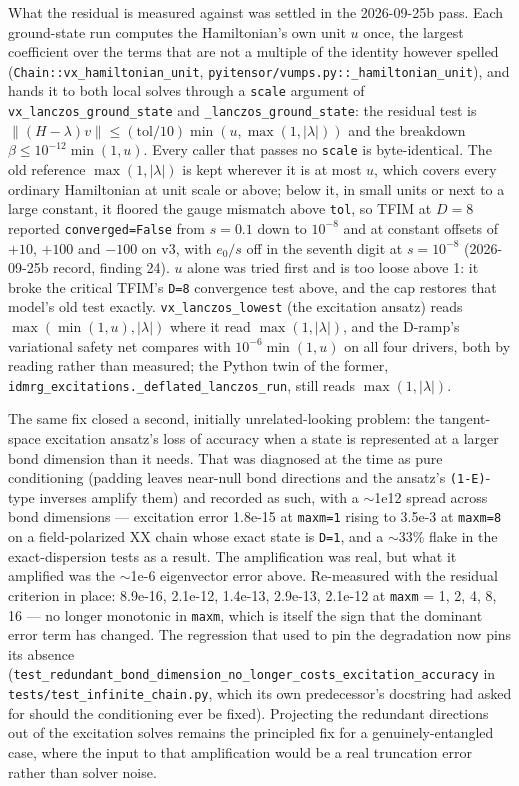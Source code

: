 \documentclass[11pt]{article}
\begin{document}
What the residual is measured against was settled in the 2026-09-25b
pass. Each ground-state run computes the Hamiltonian's own unit $u$ once,
the largest coefficient over the terms that are not a multiple of the
identity however spelled (\texttt{Chain::vx\_hamiltonian\_unit},
\texttt{pyitensor/vumps.py::\_hamiltonian\_unit}), and hands it to both
local solves through a \texttt{scale} argument of
\texttt{vx\_lanczos\_ground\_state} and \texttt{\_lanczos\_ground\_state}:
the residual test is
$\lVert(H-\lambda)v\rVert\le(\mathrm{tol}/10)\min(u,\max(1,|\lambda|))$
and the breakdown $\beta\le10^{-12}\min(1,u)$. Every caller that passes
no \texttt{scale} is byte-identical. The old reference
$\max(1,|\lambda|)$ is kept wherever it is at most $u$, which covers every
ordinary Hamiltonian at unit scale or above; below it, in small units or
next to a large constant, it floored the gauge mismatch above
\texttt{tol}, so TFIM at $D=8$ reported \texttt{converged=False} from
$s=0.1$ down to $10^{-8}$ and at constant offsets of $+10$, $+100$ and
$-100$ on v3, with $e_0/s$ off in the seventh digit at $s=10^{-8}$
(2026-09-25b record, finding 24). $u$ alone was tried first and is too
loose above 1: it broke the critical TFIM's \texttt{D=8} convergence test
above, and the cap restores that model's old test exactly.
\texttt{vx\_lanczos\_lowest} (the excitation ansatz) reads
$\max(\min(1,u),|\lambda|)$ where it read $\max(1,|\lambda|)$, and the
D-ramp's variational safety net compares with $10^{-6}\min(1,u)$ on all
four drivers, both by reading rather than measured; the Python twin of the
former, \texttt{idmrg\_excitations.\_deflated\_lanczos\_run}, still reads
$\max(1,|\lambda|)$.

The same fix closed a second, initially unrelated-looking problem: the
tangent-space excitation ansatz's loss of accuracy when a state is
represented at a larger bond dimension than it needs. That was diagnosed
at the time as pure conditioning (padding leaves near-null bond directions
and the ansatz's \texttt{(1-E)}-type inverses amplify them) and recorded as
such, with a $\sim$1e12 spread across bond dimensions --- excitation error
1.8e-15 at \texttt{maxm=1} rising to 3.5e-3 at \texttt{maxm=8} on a
field-polarized XX chain whose exact state is \texttt{D=1}, and a
$\sim$33\% flake in the exact-dispersion tests as a result. The
amplification was real, but what it amplified was the $\sim$1e-6
eigenvector error above. Re-measured with the residual criterion in place:
8.9e-16, 2.1e-12, 1.4e-13, 2.9e-13, 2.1e-12 at \texttt{maxm} = 1, 2, 4, 8,
16 --- no longer monotonic in \texttt{maxm}, which is itself the sign that
the dominant error term has changed. The regression that used to pin the
degradation now pins its absence
(\texttt{test\_redundant\_bond\_dimension\_no\_longer\_costs\_excitation\_accuracy}
in \texttt{tests/test\_infinite\_chain.py}, which its own predecessor's
docstring had asked for should the conditioning ever be fixed). Projecting
the redundant directions out of the excitation solves remains the
principled fix for a genuinely-entangled case, where the input to that
amplification would be a real truncation error rather than solver noise.
\end{document}
